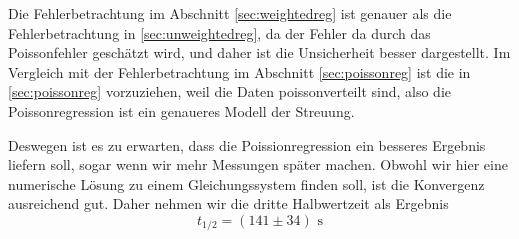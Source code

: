 \documentclass[prb,12pt]{revtex4-2}
\theoremstyle{definition}
\theoremstyle{definition}
\begin{document}
Die Fehlerbetrachtung im Abschnitt \ref{sec:weightedreg} ist genauer als die Fehlerbetrachtung in \ref{sec:unweightedreg}, da der Fehler da durch das Poissonfehler geschätzt wird, und daher ist die Unsicherheit besser dargestellt. Im Vergleich mit der Fehlerbetrachtung im Abschnitt \ref{sec:poissonreg} ist die in \ref{sec:poissonreg} vorzuziehen, weil die Daten poissonverteilt sind, also die Poissonregression ist ein genaueres Modell der Streuung. 

Deswegen ist es zu erwarten, dass die Poissionregression ein besseres Ergebnis liefern soll, sogar wenn wir mehr Messungen später machen. Obwohl wir hier eine numerische Lösung zu einem Gleichungssystem finden soll, ist die Konvergenz ausreichend gut. Daher nehmen wir die dritte Halbwertzeit als Ergebnis
\[t_{1/2}=(141\pm 34)\text{ s}\]
\end{document}
